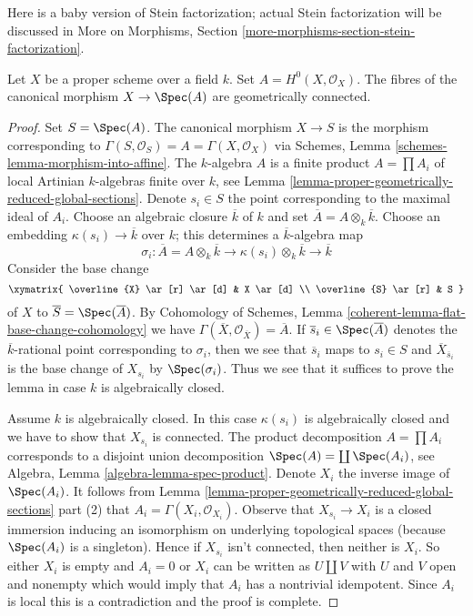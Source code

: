 \noindent
Here is a baby version of Stein factorization; actual Stein
factorization will be discussed in
More on Morphisms, Section \ref{more-morphisms-section-stein-factorization}.

\begin{lemma}
\label{lemma-baby-stein}
Let $X$ be a proper scheme over a field $k$. Set
$A = H^0(X, \mathcal{O}_X)$. The fibres of the canonical
morphism $X \to \Spec(A)$ are geometrically connected.
\end{lemma}

\begin{proof}
Set $S = \Spec(A)$. The canonical morphism $X \to S$
is the morphism corresponding to
$\Gamma(S, \mathcal{O}_S) = A = \Gamma(X, \mathcal{O}_X)$ via
Schemes, Lemma \ref{schemes-lemma-morphism-into-affine}.
The $k$-algebra $A$ is a finite product $A = \prod A_i$
of local Artinian $k$-algebras finite over $k$, see
Lemma \ref{lemma-proper-geometrically-reduced-global-sections}.
Denote $s_i \in S$ the point corresponding to the maximal
ideal of $A_i$. Choose an algebraic closure $\overline{k}$ of $k$ and
set $\overline{A} = A \otimes_k \overline{k}$.
Choose an embedding $\kappa(s_i) \to \overline{k}$ over $k$; this
determines a $\overline{k}$-algebra map
$$
\sigma_i : \overline{A} = A \otimes_k \overline{k} \to
\kappa(s_i) \otimes_k \overline{k} \to \overline{k}
$$
Consider the base change
$$
\xymatrix{
\overline{X} \ar[r] \ar[d] & X \ar[d] \\
\overline{S} \ar[r] & S
}
$$
of $X$ to $\overline{S} = \Spec(\overline{A})$. By
Cohomology of Schemes, Lemma
\ref{coherent-lemma-flat-base-change-cohomology} we have
$\Gamma(\overline{X}, \mathcal{O}_{\overline{X}}) = \overline{A}$.
If $\overline{s}_i \in \Spec(\overline{A})$ denotes the
$\overline{k}$-rational point corresponding to $\sigma_i$,
then we see that $\overline{s}_i$ maps to $s_i \in S$
and $\overline{X}_{\overline{s}_i}$ is the base change of
$X_{s_i}$ by $\Spec(\sigma_i)$. Thus we see that it suffices to prove
the lemma in case $k$ is algebraically closed.

\medskip\noindent
Assume $k$ is algebraically closed. In this case $\kappa(s_i)$
is algebraically closed and we have to show that $X_{s_i}$
is connected. The product decomposition
$A = \prod A_i$ corresponds to a disjoint union decomposition
$\Spec(A) = \coprod \Spec(A_i)$, see
Algebra, Lemma \ref{algebra-lemma-spec-product}.
Denote $X_i$ the inverse image of $\Spec(A_i)$.
It follows from
Lemma \ref{lemma-proper-geometrically-reduced-global-sections} part (2) that
$A_i = \Gamma(X_i, \mathcal{O}_{X_i})$.
Observe that $X_{s_i} \to X_i$ is a closed immersion inducing
an isomorphism on underlying topological spaces (because $\Spec(A_i)$
is a singleton). Hence if $X_{s_i}$ isn't connected, then neither is
$X_i$. So either $X_i$ is empty and $A_i = 0$ or $X_i$ can be written
as $U \amalg V$ with $U$ and $V$ open and nonempty which would
imply that $A_i$ has a nontrivial idempotent. Since $A_i$ is
local this is a contradiction and the proof is complete.
\end{proof}

